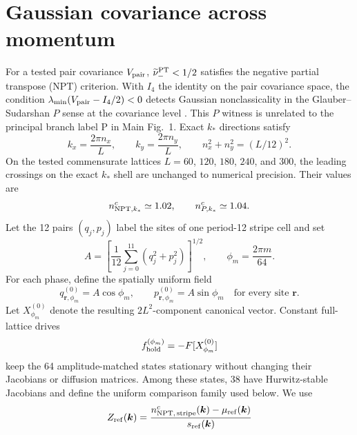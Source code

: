 \documentclass[aps,prl,twocolumn,superscriptaddress,nofootinbib,floatfix]{revtex4-2}
\begin{document}
\section{Gaussian covariance across momentum}
For a tested pair covariance $V_{\rm pair}$, $\widetilde\nu_-^{\rm PT}<1/2$ satisfies the negative partial transpose (NPT) criterion. With $I_4$ the identity on the pair covariance space, the condition $\lambda_{\min}(V_{\rm pair}-I_4/2)<0$ detects Gaussian nonclassicality in the Glauber--Sudarshan $P$ sense at the covariance level \cite{Simon2000,Weedbrook2012}. This $P$ witness is unrelated to the principal branch label P in Main Fig.~1. Exact $k_*$ directions satisfy
\begin{equation}
 k_x=\frac{2\pi n_x}{L},
 \qquad k_y=\frac{2\pi n_y}{L},
 \qquad n_x^2+n_y^2=(L/12)^2.
 \label{eq:exactShellS}
\end{equation}
On the tested commensurate lattices $L=60$, $120$, $180$, $240$, and $300$, the leading crossings on the exact $k_*$ shell are unchanged to numerical precision. Their values are
\begin{equation}
 n_{{\rm NPT},k_*}^{c}\simeq1.02,
 \qquad
 n_{P,k_*}^{c}\simeq1.04.
 \label{eq:shellThresholdsS}
\end{equation}
Let the 12 pairs $(q_j,p_j)$ label the sites of one period-12 stripe cell and set
\begin{equation}
 A=\left[\frac1{12}\sum_{j=0}^{11}(q_j^2+p_j^2)\right]^{1/2},
 \qquad
 \phi_m=\frac{2\pi m}{64}.
 \label{eq:referenceAmplitudeS}
\end{equation}
For each phase, define the spatially uniform field
\begin{equation}
 q_{\bm r,\phi_m}^{(0)}=A\cos\phi_m,
 \qquad
 p_{\bm r,\phi_m}^{(0)}=A\sin\phi_m
 \quad\text{for every site }\bm r.
 \label{eq:referenceFieldS}
\end{equation}
Let $X_{\phi_m}^{(0)}$ denote the resulting $2L^2$-component canonical vector. Constant full-lattice drives
\begin{equation}
 f_{\rm hold}^{(\phi_m)}=-F[X_{\phi_m}^{(0)}]
 \label{eq:holdingForceS}
\end{equation}
keep the 64 amplitude-matched states stationary without changing their Jacobians or diffusion matrices. Among these states, 38 have Hurwitz-stable Jacobians and define the uniform comparison family used below. We use
\begin{equation}
 Z_{\rm ref}(\bm k)=\frac{n_{{\rm NPT},\,\rm stripe}^{c}(\bm k)-\mu_{\rm ref}(\bm k)}{s_{\rm ref}(\bm k)}
 \label{eq:ZrefS}
\end{equation}
\end{document}

